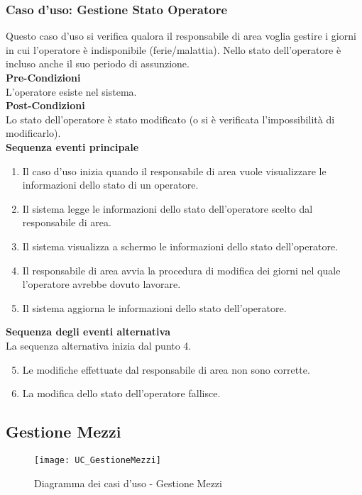 \documentclass[green, fancy, 11pt]{elegantbook}
\begin{document}
\subsubsection{Caso d'uso: Gestione Stato Operatore}

Questo caso d’uso si verifica qualora il responsabile di area voglia gestire i giorni in cui l’operatore è indisponibile (ferie/malattia). Nello stato dell’operatore è incluso anche il suo periodo di assunzione.\\
\textbf{Pre-Condizioni}\\
L'operatore esiste nel sistema.\\
\textbf{Post-Condizioni}\\
Lo stato dell'operatore è stato modificato (o si è verificata l’impossibilità di modificarlo).\\
\textbf{Sequenza eventi principale}
\begin{enumerate}
	\item Il caso d’uso inizia quando il responsabile di area vuole visualizzare le informazioni dello stato di un operatore.
	\item Il sistema legge le informazioni dello stato dell’operatore scelto dal responsabile di area.
	\item Il sistema visualizza a schermo le informazioni dello stato dell’operatore.
	\item Il responsabile di area avvia la procedura di modifica dei giorni nel quale l’operatore avrebbe dovuto lavorare.
	\item Il sistema aggiorna le informazioni dello stato dell’operatore.
\end{enumerate}
\textbf{Sequenza degli eventi alternativa}\\
La sequenza alternativa inizia dal punto 4.
\begin{enumerate}
	\setcounter{enumi}{4}
	\item Le modifiche effettuate dal responsabile di area non sono corrette.
	\item La modifica dello stato dell'operatore fallisce.
\end{enumerate}
\newpage


\subsection{Gestione Mezzi}
\begin{figure}[H]
	\centering
	\texttt{[image: UC\_GestioneMezzi]}
	\caption{Diagramma dei casi d'uso - Gestione Mezzi}
\end{figure}
\end{document}
